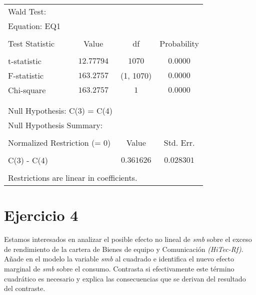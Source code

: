 \documentclass[12pt]{article}
\numberwithin{equation}{section} %
\begin{document}
\begin{table}[!htbp]
\centering
\begin{tabular}{lrrr}
\multicolumn{1}{l}{Wald Test:}&\multicolumn{1}{c}{}&\multicolumn{1}{c}{}&\multicolumn{1}{c}{}\\
\multicolumn{2}{l}{Equation: EQ1}&\multicolumn{1}{c}{}&\multicolumn{1}{c}{}\\
[4.5pt] \hline \\ [-4.5pt]
\multicolumn{1}{l}{Test Statistic}&\multicolumn{1}{c}{Value}&\multicolumn{1}{c}{df}&\multicolumn{1}{c}{Probability}\\
[4.5pt] \hline \\ [-4.5pt]
\multicolumn{1}{l}{t-statistic}&\multicolumn{1}{c}{$12.77794$}&\multicolumn{1}{c}{$1070$}&\multicolumn{1}{c}{$0.0000$}\\
\multicolumn{1}{l}{F-statistic}&\multicolumn{1}{c}{$163.2757$}&\multicolumn{1}{c}{(1, 1070)}&\multicolumn{1}{c}{$0.0000$}\\
\multicolumn{1}{l}{Chi-square}&\multicolumn{1}{c}{$163.2757$}&\multicolumn{1}{c}{$1$}&\multicolumn{1}{c}{$0.0000$}\\
[4.5pt] \hline \\ [-4.5pt]
\multicolumn{1}{c}{}&\multicolumn{1}{c}{}&\multicolumn{1}{c}{}&\multicolumn{1}{c}{}\\
\multicolumn{2}{l}{Null Hypothesis: C(3) = C(4)}&\multicolumn{1}{c}{}&\multicolumn{1}{c}{}\\
\multicolumn{2}{l}{Null Hypothesis Summary:}&\multicolumn{1}{c}{}&\multicolumn{1}{c}{}\\
[4.5pt] \hline \\ [-4.5pt]
\multicolumn{2}{l}{Normalized Restriction (= 0)}&\multicolumn{1}{c}{Value}&\multicolumn{1}{c}{Std. Err.}\\
[4.5pt] \hline \\ [-4.5pt]
\multicolumn{2}{l}{C(3) - C(4)}&\multicolumn{1}{c}{$0.361626$}&\multicolumn{1}{c}{$0.028301$}\\
[4.5pt] \hline \\ [-4.5pt]
\multicolumn{3}{l}{Restrictions are linear in coefficients.}&\multicolumn{1}{c}{}\\
\end{tabular}
\end{table}

\section{Ejercicio 4} Estamos interesados en analizar el posible efecto no lineal de \textit{smb} sobre el exceso de rendimiento de la cartera de Bienes de equipo y Comunicación \textit{(HiTec-Rf)}. Añade en el modelo la variable \textit{smb} al cuadrado e identifica el nuevo efecto marginal de \textit{smb} sobre el consumo. Contrasta si efectivamente este término cuadrático es necesario y explica las consecuencias que se derivan del resultado del contraste.
\end{document}
